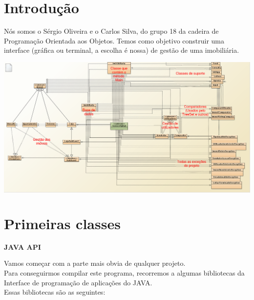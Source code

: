 \documentclass[12pt]{article}
\begin{document}

\maketitle                                            %
\pagebreak

\section{Introdução}

Nós somos o Sérgio Oliveira e o Carlos Silva, do grupo 18 da cadeira de Programação Orientada aos Objetos. Temos como objetivo construir uma interface (gráfica ou terminal, a escolha é nossa) de gestão de uma imobiliária.


\includegraphics[scale=0.27]{004.png}	
\pagebreak

\section{Primeiras classes}

\textbf{JAVA API}
\newline

Vamos começar com a parte mais obvia de qualquer projeto.\\
Para conseguirmos compilar este programa, recorremos a algumas bibliotecas da Interface de programação de aplicações do JAVA.\\
Essas bibliotecas são as seguintes:
\newline
\end{document}

